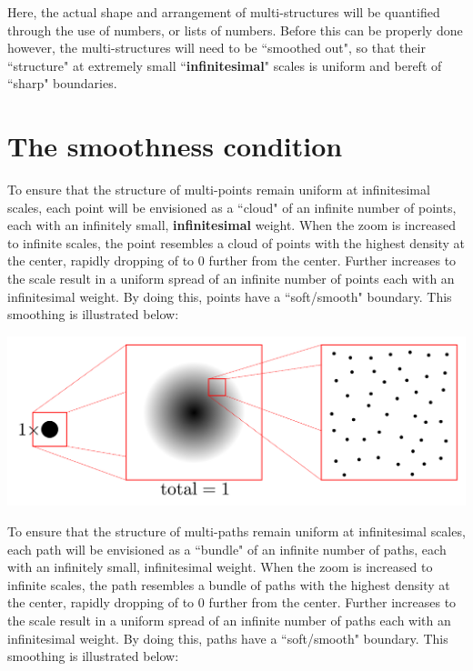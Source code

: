 \documentclass{book}
\begin{document}
Here, the actual shape and arrangement of multi-structures will be quantified through the use of numbers, or lists of numbers. Before this can be properly done however, the multi-structures will need to be ``smoothed out", so that their ``structure" at extremely small ``{\bf infinitesimal}" scales is uniform and bereft of ``sharp" boundaries.

\section{The smoothness condition}

To ensure that the structure of multi-points remain uniform at infinitesimal scales, each point will be envisioned as a ``cloud" of an infinite number of points, each with an infinitely small, {\bf infinitesimal} weight. When the zoom is increased to infinite scales, the point resembles a cloud of points with the highest density at the center, rapidly dropping of to \(0\) further from the center. Further increases to the scale result in a uniform spread of an infinite number of points each with an infinitesimal weight. By doing this, points have a ``soft/smooth" boundary. This smoothing is illustrated below:

\begin{center}
\includegraphics[width = \textwidth]{Smoothness_and_duality/point_smoothing}
\end{center}

To ensure that the structure of multi-paths remain uniform at infinitesimal scales, each path will be envisioned as a ``bundle" of an infinite number of paths, each with an infinitely small, infinitesimal weight. When the zoom is increased to infinite scales, the path resembles a bundle of paths with the highest density at the center, rapidly dropping of to \(0\) further from the center. Further increases to the scale result in a uniform spread of an infinite number of paths each with an infinitesimal weight. By doing this, paths have a ``soft/smooth" boundary. This smoothing is illustrated below:
\end{document}
